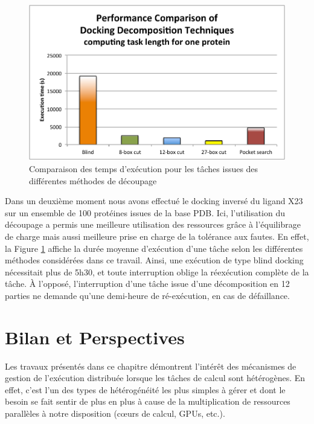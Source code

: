 \begin{figure}
	\centering
		\includegraphics[width=0.5\linewidth]{images/Romain/fig7-color}
		\caption{Comparaison des temps d'exécution pour les tâches issues des différentes méthodes de découpage}\label{fig:performance} %

\end{figure}


 
Dans un deuxième moment nous avons effectué le docking inversé du ligand X23 sur un ensemble de 100 protéines issues de la base PDB. Ici, l'utilisation du découpage a permis une  meilleure utilisation des ressources grâce à l'équilibrage de charge %
mais aussi meilleure prise en charge de la tolérance aux fautes. En effet, la Figure \ref{fig:performance} affiche la durée moyenne d'exécution d'une tâche selon les différentes méthodes considérées dans ce travail. Ainsi, une exécution de type blind docking nécessitait plus de 5h30, et toute interruption oblige la réexécution complète de la tâche. À l'opposé, l'interruption d'une tâche issue d'une décomposition en 12 parties ne demande qu'une demi-heure de ré-exécution, en cas de défaillance.  


 

\section{Bilan et Perspectives} \label{sec:disc}

Les travaux présentés dans ce chapitre démontrent l'intérêt des mécanismes de gestion de l'exécution distribuée lorsque les tâches de calcul sont hétérogènes. En effet, c'est l'un des types de hétérogénéité les plus simples à gérer et dont le besoin se fait sentir de plus en plus à cause de la multiplication de ressources parallèles à notre disposition (c{\oe}urs de calcul, GPUs, etc.). 

